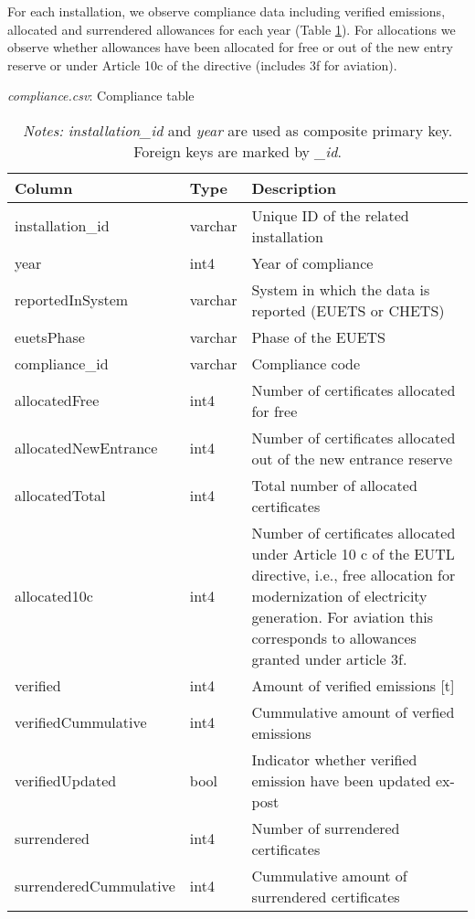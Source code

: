 \documentclass[authoryear]{elsarticle}
\begin{document}
For each installation, we observe compliance data including verified emissions, allocated and surrendered allowances for each year (Table \ref{tab:tbl_compliance}). For allocations we observe whether allowances have been allocated for free or out of the new entry reserve or under Article 10c of the directive (includes 3f for aviation).

\begin{table}[htbp]\scriptsize
	\caption{\textit{compliance.csv}: Compliance table}\label{tab:tbl_compliance}
	\centering
	\begin{tabular*}{\textwidth}{@{}@{\extracolsep{\fill}} llp{8cm} @{}}
		\toprule
		\toprule
		\textbf{Column} & \textbf{Type}  & \textbf{Description} \\
		\midrule
		installation\_id & varchar & Unique ID of the related installation \\
		year  & int4  & Year of compliance \\
		reportedInSystem & varchar  & System in which the data is reported (EUETS or CHETS) \\
		euetsPhase & varchar & Phase of the EUETS \\
		compliance\_id & varchar & Compliance code \\
		allocatedFree & int4  & Number of certificates allocated for free \\
		allocatedNewEntrance & int4  & Number of certificates allocated out of the new entrance reserve \\
		allocatedTotal & int4  & Total number of allocated certificates \\
		allocated10c & int4  & Number of certificates allocated under Article 10 c of the EUTL directive, i.e., free allocation for modernization of electricity generation. For aviation this corresponds to allowances granted under article 3f. \\
		verified & int4  & Amount of verified emissions [t] \\
		verifiedCummulative & int4  & Cummulative amount of verfied emissions \\
		verifiedUpdated & bool  & Indicator whether verified emission have been updated ex-post \\
		surrendered & int4  & Number of surrendered certificates \\
		surrenderedCummulative & int4  & Cummulative amount of surrendered certificates \\
		\bottomrule
		\bottomrule
	\end{tabular*}%
	\vspace{-3ex}
	\caption*{\footnotesize \emph{Notes:} \textit{installation\_id} and \textit{year} are used as composite primary key. Foreign keys are marked by \textit{\_id}.}
	\vspace{0ex}
\end{table}
\end{document}
